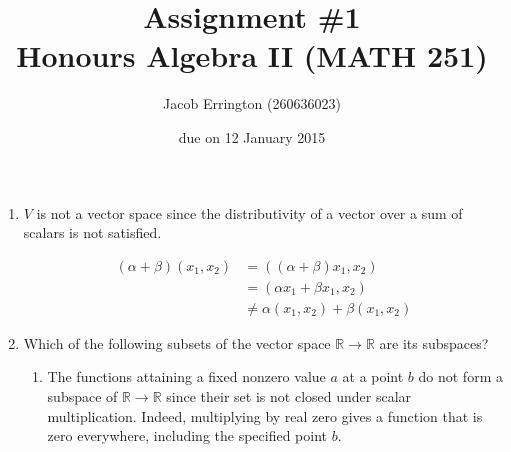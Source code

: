 \documentclass{article}
\author{Jacob Errington (260636023)}
\title{Assignment \#1\\Honours Algebra II (MATH 251)}
\date{due on 12 January 2015}
\newcommand{\R}{\mathbb{R}}
\begin{document}
\maketitle

\begin{enumerate}
    \item $V$ is not a vector space since the distributivity of a vector over a
        sum of scalars is not satisfied.

        \begin{align*}
            (\alpha + \beta) (x_1, x_2) &= ((\alpha + \beta) x_1, x_2) \\
                                        &= (\alpha x_1 + \beta x_1, x_2) \\
                                        &\neq \alpha (x_1, x_2) + \beta (x_1,
            x_2)
        \end{align*}




    \item Which of the following subsets of the vector space $\R \to \R$ are
        its subspaces?

        \begin{enumerate}
            \item The functions attaining a fixed nonzero value $a$ at a point
                $b$ do not form a subspace of $\R \to \R$ since their set is
                not closed under scalar multiplication. Indeed, multiplying by
                real zero gives a function that is zero everywhere, including
                the specified point $b$.


\end{enumerate}
\end{enumerate}
\end{document}
